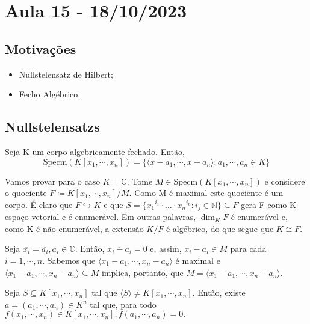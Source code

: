 \documentclass[algebraII_notes.tex]{subfiles}
\begin{document}
\section{Aula 15 - 18/10/2023}
\subsection{Motivações}
\begin{itemize}
	\item Nullstelensatz de Hilbert;
	\item Fecho Algébrico.
\end{itemize}
\subsection{Nullstelensatzs}
\begin{theorem*}
	Seja K um corpo algebricamente fechado. Então,
	\[
		\mathrm{Specm}(K[x_{1}, \cdots, x_{n}]) = \{\langle x-a_{1}, \cdots, x-a_{n} \rangle: a_{1}, \cdots, a_{n}\in K\}
	\]
\end{theorem*}
\begin{proof*}
	Vamos provar para o caso \(K = \mathbb{C}.\) Tome \(M\in \mathrm{Specm}(K[x_{1}, \cdots, x_{n}])\) e considere o quociente \(F \coloneq K[x_{1}, \cdots, x_{n}]/M\). Como M é maximal
	este quociente é um corpo. É claro que \(F\hookrightarrow K\) e que \(S=\{\overline{x_{1}}^{i_{1}}\cdot \dotsc \cdot \overline{x_{n}}^{i_{n}}: i_{j}\in \mathbb{N}\} \subseteq{F}\)
	gera F como K-espaço vetorial e é enumerável. Em outras palavras, \(\dim_{K}F\) é enumerável e, como K é não enumerável, a extensão
	\(K/F\) é algébrico, do que segue que \(K\cong{F}.\)

	Seja \(\overline{x_{i}} = \overline{a_{i}}, a_{i}\in \mathbb{C}\). Então, \(\overline{x_{i} - a_{i}} = \overline{0}\) e, assim, \(x_{i}-a_{i}\in M\) para cada \(i=1, \cdots, n.\)
	Sabemos que \(\langle x_{1}-a_{1}, \cdots, x_{n}-a_{n} \rangle\) é maximal e \(\langle x_{1}-a_{1}, \cdots, x_{n}-a_{n} \rangle \subseteq{M}\) implica, portanto, que
	\(M = \langle x_{1}-a_{1}, \cdots, x_{n}-a_{n} \rangle\). \qedsymbol
\end{proof*}
\begin{theorem*}
	Seja \(S \subseteq{K[x_{1}, \cdots, x_{n}]}\) tal que \(\langle S \rangle\neq K[x_{1}, \cdots, x_{n}].\) Então, existe \(a=(a_{1}, \cdots, a_{n})\in K^{n}\)
	tal que, para todo \(f(x_{1}, \cdots, x_{n})\in K[x_{1}, \cdots, x_{n}], f(a_{1}, \cdots, a_{n}) = 0.\)
\end{theorem*}
\end{document}

